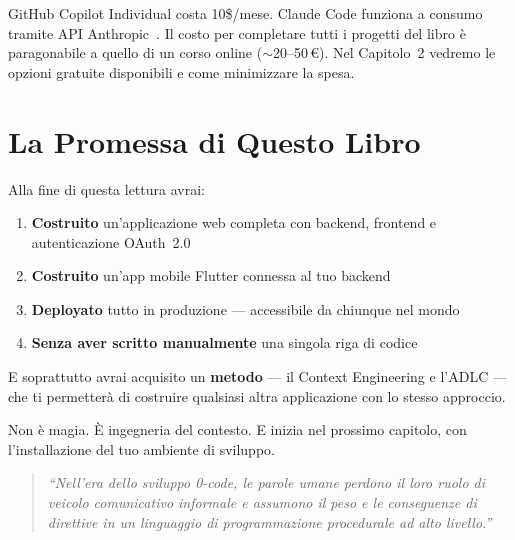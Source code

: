 \begin{costbox}
GitHub Copilot Individual costa 10\$/mese. Claude Code funziona a consumo tramite API Anthropic~\cite{anthropic:claude-code}. Il costo per completare tutti i progetti del libro è paragonabile a quello di un corso online ($\sim$20--50\,\euro). Nel Capitolo~2 vedremo le opzioni gratuite disponibili e come minimizzare la spesa.
\end{costbox}

\section{La Promessa di Questo Libro}

Alla fine di questa lettura avrai:

\begin{enumerate}
  \item \textbf{Costruito} un'applicazione web completa con backend, frontend e autenticazione OAuth~2.0
  \item \textbf{Costruito} un'app mobile Flutter connessa al tuo backend
  \item \textbf{Deployato} tutto in produzione --- accessibile da chiunque nel mondo
  \item \textbf{Senza aver scritto manualmente} una singola riga di codice
\end{enumerate}

E soprattutto avrai acquisito un \textbf{metodo} --- il Context Engineering e l'ADLC --- che ti permetterà di costruire qualsiasi altra applicazione con lo stesso approccio.

Non è magia. È ingegneria del contesto. E inizia nel prossimo capitolo, con l'installazione del tuo ambiente di sviluppo.

\bigskip
\begin{quote}
\itshape ``Nell'era dello sviluppo 0-code, le parole umane perdono il loro ruolo di veicolo comunicativo informale e assumono il peso e le conseguenze di direttive in un linguaggio di programmazione procedurale ad alto livello.''
\end{quote}

